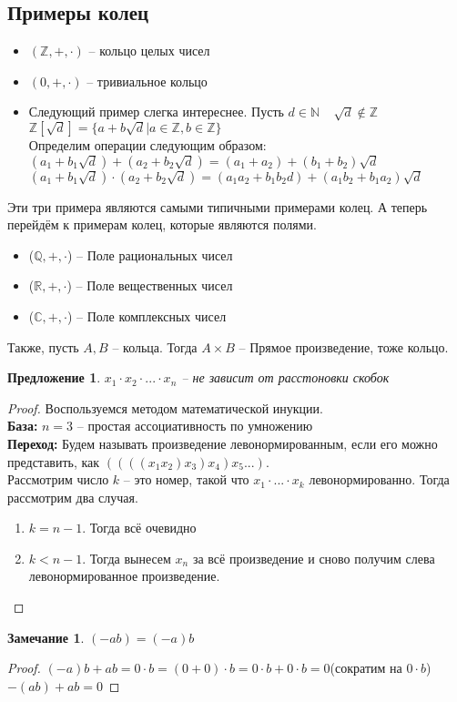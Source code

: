 \documentclass[12pt, a4paper]{article}
\newcommand{\re}{\mathds{R}}
\newcommand{\qu}{\mathds{Q}}
\newcommand{\nat}{\mathds{N}}
\newcommand{\ce}{\mathds{C}}
\newcommand{\Z}{\mathds{Z}}
\theoremstyle{plain}
\newtheorem*{Proposition*}{Предложение}
\theoremstyle{definition}
\newtheorem*{Remark*}{Замечание}
\begin{document}
\subsection*{Примеры колец}
\begin{itemize}
    \item $(\Z,+,\cdot)$ -- кольцо целых чисел
    \item $(0,+,\cdot)$ -- тривиальное кольцо
    \item Следующий пример слегка интереснее. Пусть $d\in \nat\;\;\;\sqrt[]{d}\notin \Z$
            \\
            $\Z[\sqrt{d}] = \{a+b\sqrt{d}| a \in \Z, b \in \Z\}$\\
            Определим операции следующим образом: \\$(a_1+b_1\sqrt{d})+(a_2+b_2\sqrt{d}) = (a_1+a_2)+(b_1+b_2)\sqrt{d}$\\
            $(a_1+b_1\sqrt{d})\cdot(a_2+b_2\sqrt{d}) = (a_1a_2+b_1b_2d)+(a_1b_2+b_1a_2)\sqrt{d}$
\end{itemize}
Эти три примера являются самыми типичными примерами колец. А теперь перейдём к примерам колец, которые являются полями.
\begin{itemize}
    \item ($\qu, +, \cdot$) -- Поле рациональных чисел
    \item ($\re, +, \cdot$) -- Поле вещественных чисел
    \item ($\ce, +, \cdot$) -- Поле комплексных чисел
\end{itemize}
Также, пусть $A,B$ -- кольца. Тогда $A\times B$ -- Прямое произведение, тоже кольцо.
\begin{Proposition*}
    $x_1\cdot x_2\cdot...\cdot x_n$ -- не зависит от расстоновки скобок
\end{Proposition*}
\begin{proof}
    Воспользуемся методом математической инукции.
    \\
    \textbf{База:} $n=3$ -- простая ассоциативность по умножению\\
    \textbf{Переход:} Будем называть произведение левонормированным, если его можно представить, как $((((x_1x_2)x_3)x_4)x_5...)$.\\
    Рассмотрим число $k$ -- это номер, такой что $x_1\cdot...\cdot x_k$ левонормированно. Тогда рассмотрим два случая.
    \begin{enumerate}
        \item   $k=n-1$. Тогда всё очевидно
        \item   $k<n-1$. Тогда вынесем $x_n$ за всё произведение и сново получим слева левонормированное произведение.
    \end{enumerate}
\end{proof}
\begin{Remark*}
    $(-ab) = (-a)b$
\end{Remark*}
\begin{proof}
$(-a)b + ab = 0\cdot b = (0+0)\cdot b = 0\cdot b+0\cdot b = 0$(сократим на $0\cdot b$)\\
$-(ab)+ab = 0$
\end{proof}
\end{document}
